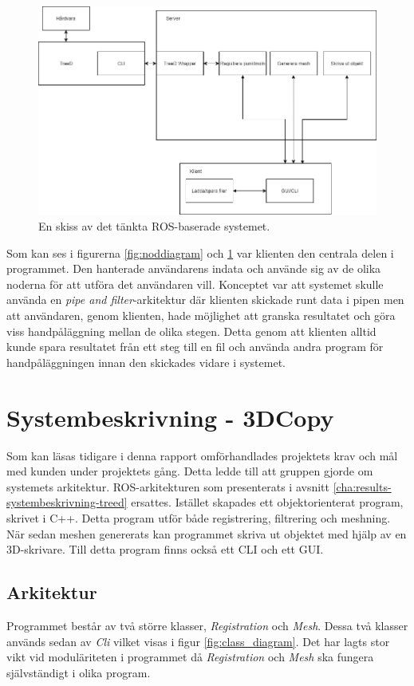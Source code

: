 \begin{figure}[H]
	\centering
	\includegraphics[width=130mm]{figures/Systemskiss_gamla.png}
	\caption{En skiss av det tänkta ROS-baserade systemet.}
	\label{fig:systembeskrivning_gamla}
\end{figure}

Som kan ses i figurerna \ref{fig:noddiagram} och \ref{fig:systembeskrivning_gamla} var klienten den centrala delen i programmet. Den hanterade användarens indata och använde sig av de olika noderna för att utföra det användaren vill. Konceptet var att systemet skulle använda en \textit{pipe and filter}-arkitektur där klienten skickade runt data i pipen men att användaren, genom klienten, hade möjlighet att granska resultatet och göra viss handpåläggning mellan de olika stegen. Detta genom att klienten alltid kunde spara resultatet från ett steg till en fil och använda andra program för handpåläggningen innan den skickades vidare i systemet.

\section{Systembeskrivning - 3DCopy}

Som kan läsas tidigare i denna rapport omförhandlades projektets krav och mål med kunden under projektets gång. Detta ledde till att gruppen gjorde om systemets arkitektur. ROS-arkitekturen som presenterats i avsnitt \ref{cha:results-systembeskrivning-treed} ersattes. Istället skapades ett objektorienterat program, skrivet i C++. Detta program utför både registrering, filtrering och meshning. När sedan meshen genererats kan programmet skriva ut objektet med hjälp av en 3D-skrivare. Till detta program finns också ett CLI och ett GUI.

\subsection{Arkitektur}
Programmet består av två större klasser, \textit{Registration} och \textit{Mesh}. Dessa två klasser används sedan av \textit{Cli} vilket visas i figur \ref{fig:class_diagram}.  Det har lagts stor vikt vid moduläriteten i programmet då \textit{Registration} och \textit{Mesh} ska fungera självständigt i olika program.

